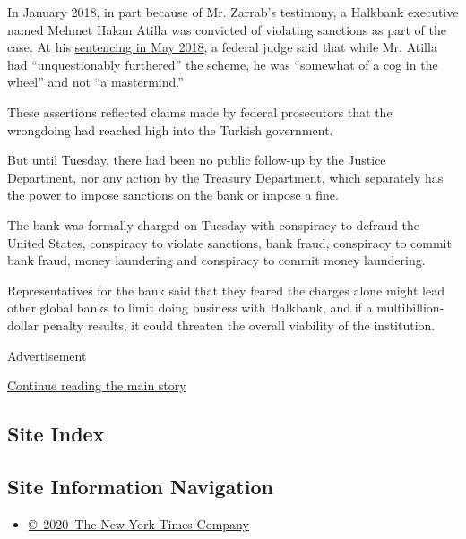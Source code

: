 In January 2018, in part because of Mr. Zarrab's testimony, a Halkbank
executive named Mehmet Hakan Atilla was convicted of violating sanctions
as part of the case. At his
\href{https://www.justice.gov/usao-sdny/pr/turkish-banker-mehmet-hakan-atilla-sentenced-32-months-conspiring-violate-us-sanctions}{sentencing
in May 2018}, a federal judge said that while Mr. Atilla had
``unquestionably furthered'' the scheme, he was ``somewhat of a cog in
the wheel'' and not ``a mastermind.''

These assertions reflected claims made by federal prosecutors that the
wrongdoing had reached high into the Turkish government.

But until Tuesday, there had been no public follow-up by the Justice
Department, nor any action by the Treasury Department, which separately
has the power to impose sanctions on the bank or impose a fine.

The bank was formally charged on Tuesday with conspiracy to defraud the
United States, conspiracy to violate sanctions, bank fraud, conspiracy
to commit bank fraud, money laundering and conspiracy to commit money
laundering.

Representatives for the bank said that they feared the charges alone
might lead other global banks to limit doing business with Halkbank, and
if a multibillion-dollar penalty results, it could threaten the overall
viability of the institution.

Advertisement

\protect\hyperlink{after-bottom}{Continue reading the main story}

\hypertarget{site-index}{%
\subsection{Site Index}\label{site-index}}

\hypertarget{site-information-navigation}{%
\subsection{Site Information
Navigation}\label{site-information-navigation}}

\begin{itemize}
\tightlist
\item
  \href{https://help.nytimes.com/hc/en-us/articles/115014792127-Copyright-notice}{©~2020~The
  New York Times Company}
\end{itemize}

